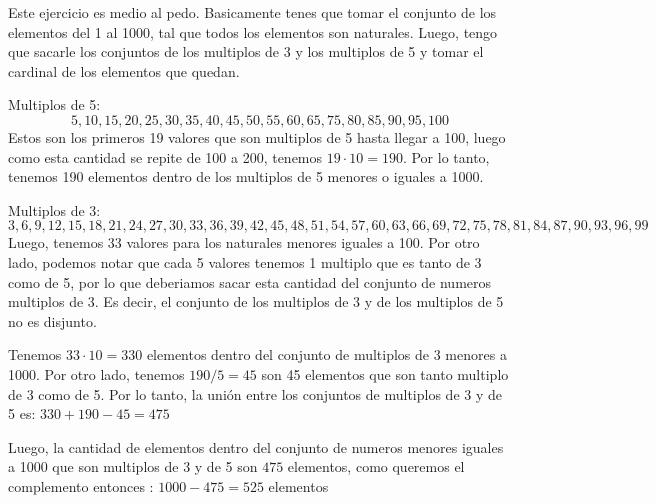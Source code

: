 \documentclass[10pt]{article}
\begin{document}

\vspace{0.5cm}


\vspace{0.5cm}

\solucion

\vspace{0.5cm}

Este ejercicio es medio al pedo. Basicamente tenes que tomar el conjunto de los elementos del 1 al 1000, tal que todos los elementos son naturales. Luego, tengo que sacarle los conjuntos de los multiplos de 3 y los multiplos de 5 y tomar el cardinal de los elementos que quedan. 

Multiplos de 5:
\[5, 10, 15, 20, 25, 30, 35, 40, 45, 50, 55, 60, 65, 75, 80, 85, 90, 95, 100\]
Estos son los primeros 19 valores que son multiplos de 5 hasta llegar a 100, luego como esta cantidad se repite de 100 a 200, tenemos $19 \cdot 10 = 190$. Por lo tanto, tenemos 190 elementos dentro de los multiplos de 5 menores o iguales a 1000. 

Multiplos de 3:
\[3, 6, 9, 12, 15, 18, 21, 24, 27, 30, 33, 36, 39, 42, 45, 48, 51, 54, 57, 60, 63, 66, 69, 72, 75, 78, 81, 84, 87, 90, 93, 96, 99\]
Luego, tenemos 33 valores para los naturales menores iguales a 100. Por otro lado, podemos notar que cada 5 valores tenemos 1 multiplo que es tanto de 3 como de 5, por lo que deberiamos sacar esta cantidad del conjunto de numeros multiplos de 3. Es decir, el conjunto de los multiplos de 3 y de los multiplos de 5 no es disjunto. 

Tenemos $33 \cdot 10 = 330$ elementos dentro del conjunto de multiplos de 3 menores a 1000. Por otro lado, tenemos $190/5 = 45$ son 45 elementos que son tanto multiplo de 3 como de 5. Por lo tanto, la unión entre los conjuntos de multiplos de 3 y de 5 es: $330 + 190 - 45 = 475$

Luego, la cantidad de elementos dentro del conjunto de numeros menores iguales a 1000 que son multiplos de 3 y de 5 son $475$ elementos, como queremos el complemento entonces : $1000 - 475 = 525$ elementos

\vspace{0.5cm}
  
\end{document}
